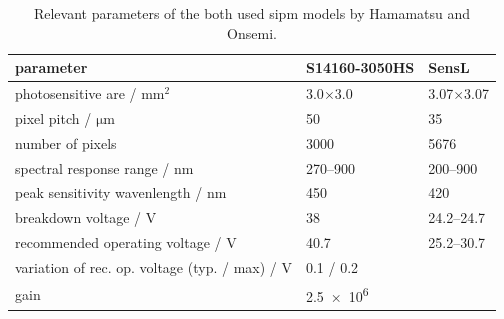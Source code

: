 \begin{table}
	\centering
	\caption[SiPM parameters]{Relevant parameters of the both used \ac{sipm} models by Hamamatsu and Onsemi. \cite{HamamatsuSiPM,SensLSiPM}}
	\label{tab:sipm_specs}
	\renewcommand{\arraystretch}{1.3}
	\begin{tabularx}{\textwidth}{Xp{}p{}}
	    \toprule
	    parameter								& S14160-3050HS		& SensL			\\\midrule
	    photosensitive are / $\si{\milli\meter\squared}$			& 3.0$\times$3.0	& 3.07$\times$3.07	\\
	    pixel pitch / $\si{\micro\meter}$					& 50			& 35			\\
	    number of pixels							& 3000			& \num{5676}		\\
	    spectral response range / $\si{\nano\meter}$			& \numrange{270}{900}	& \numrange{200}{900}	\\
	    peak sensitivity wavenlength / $\si{\nano\meter}$			& 450			& 420			\\
	    breakdown voltage / $\si{\volt}$					& 38			& \numrange{24.2}{24.7}	\\
	    recommended operating voltage / $\si{\volt}$			& 40.7			& \numrange{25.2}{30.7}	\\
	    variation of rec. op. voltage (typ. / max) / $\si{\volt}$		& 0.1 / 0.2		&			\\
	    gain								& \num{2.5e6}		&			\\
	    \bottomrule
	\end{tabularx}
	\renewcommand{\arraystretch}{1}
\end{table} 
